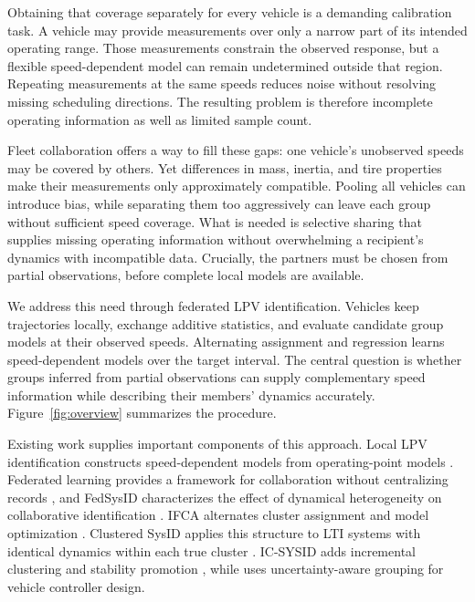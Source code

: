\documentclass[conference]{IEEEtran}
\newcommand{\rev}[1]{\textcolor{revisiongreen}{#1}}
\begin{document}
Obtaining that coverage separately for every vehicle is a demanding calibration
task. A vehicle may provide measurements over only a narrow part of its
intended operating range. Those measurements constrain the observed response,
but a flexible speed-dependent model can remain undetermined outside that
region. Repeating measurements at the same speeds reduces noise without
resolving missing scheduling directions. The resulting problem is therefore
incomplete operating information as well as limited sample count.

Fleet collaboration offers a way to fill these gaps: one vehicle's unobserved
speeds may be covered by others. Yet differences in mass, inertia, and tire
properties make their measurements only approximately compatible. Pooling
all vehicles can introduce bias, while separating them too aggressively can
leave each group without sufficient speed coverage. What is needed is selective
sharing that supplies missing operating information without overwhelming a
recipient's dynamics with incompatible data. Crucially, the partners must be
chosen from partial observations, before complete local models are available.

We address this need through federated LPV identification. Vehicles keep
trajectories locally, exchange additive statistics, and evaluate candidate
group \rev{models} at their observed speeds. Alternating assignment and regression
learns \rev{speed-dependent models} over the \rev{target} interval. The central question
is whether groups inferred from partial \rev{observations} can \rev{supply} complementary
\rev{speed information while describing} their \rev{members}' dynamics \rev{accurately}.
Figure~\ref{fig:overview} summarizes the procedure.

Existing work supplies important components of this approach. Local LPV
identification constructs \rev{speed-dependent models} from operating-point
models \cite{ferranti2017}. Federated learning provides a framework for
collaboration without centralizing records \cite{mcmahan2017fedavg}, and
FedSysID characterizes the effect of dynamical heterogeneity on collaborative
identification \cite{wang2023fedsysid}. IFCA alternates cluster assignment
and model optimization \cite{ghosh2020ifca}. Clustered SysID applies this
structure to LTI systems with identical dynamics within each true cluster
\cite{toso2023clusteredsysid}. IC-SYSID adds incremental clustering and
stability promotion \cite{kececi2025clustercraft}, while
\cite{weber2026ifac} uses uncertainty-aware grouping for vehicle controller design.
\end{document}
